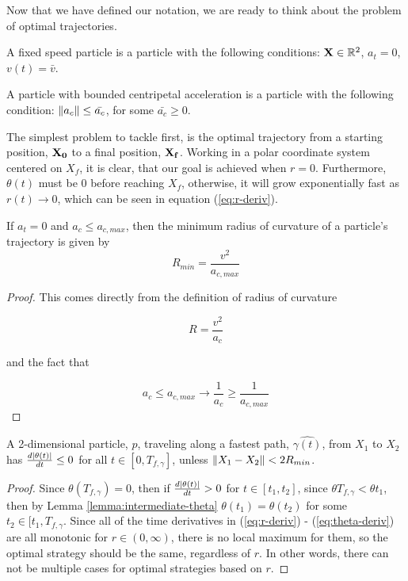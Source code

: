 Now that we have defined our notation, we are ready to think about the problem of optimal trajectories.

\begin{definition}
  A fixed speed particle is a particle with the following conditions: $\mathbf{X} \in \mathbb R^2$, $a_t = 0$, $v(t) = \bar{v}$.
\end{definition}

\begin{definition}
  A particle with bounded centripetal acceleration is a particle with the following condition: $\norm{a_c} \le \bar{a_c}$, for some $\bar{a_c} \ge 0$.
\end{definition}

The simplest problem to tackle first, is the optimal trajectory from a starting position, $\mathbf{X_0}$ to a final position, $\mathbf{X_f}$. Working in a polar coordinate system centered on $X_f$, it is clear, that our goal is achieved when $r = 0$. Furthermore, $\theta(t)$ must be $0$ before reaching $X_f$, otherwise, it will grow exponentially fast as $r(t) \to 0$, which can be seen in equation (\ref{eq:r-deriv}).

\begin{lemma}
If $a_t=0$ and $a_c \le a_{c,max}$, then the minimum radius of curvature of a particle's trajectory is given by
\begin{equation}
R_{min} = \frac{v^2}{a_{c,max}}
\end{equation}
\end{lemma}

\begin{proof}
This comes directly from the definition of radius of curvature 

\[
R = \frac{v^2}{a_c}
\]

and the fact that 

\[
a_c \le a_{c,max} \to \frac{1}{a_c} \ge \frac{1}{a_{c,max}}
\]
\end{proof}

\begin{theorem}
A 2-dimensional particle, $p$, traveling along a fastest path, $\hat{\gamma(t)}$, from $X_1$ to $X_2$ has $\frac{d\abs{\theta(t)}}{dt} \leq 0$ for all $t \in [0, T_{f, \gamma}]$, unless $\norm{X_1 - X_2} < 2 R_{min}$.
\end{theorem}

\begin{proof}
Since $\theta(T_{f,\gamma}) = 0$, then if $\frac{d\abs{\theta(t)}}{dt} > 0$ for $t \in [t_1, t_2]$, since $\theta{T_{f,\gamma}} < \theta{t_1}$, then by Lemma \ref{lemma:intermediate-theta} $\theta(t_1) = \theta(t_2)$ for some $t_2 \in [t_1, T_{f, \gamma}$. Since all of the time derivatives in (\ref{eq:r-deriv}) - (\ref{eq:theta-deriv}) are all monotonic for $r \in (0, \infty)$, there is no local maximum for them, so the optimal strategy should be the same, regardless of $r$. In other words, there can not be multiple cases for optimal strategies based on $r$.
\end{proof}

